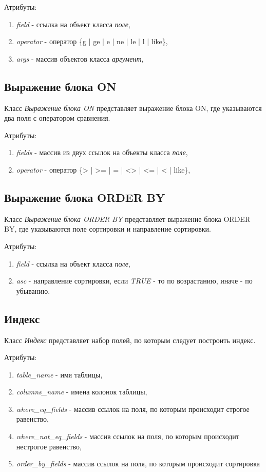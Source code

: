 Атрибуты:
\begin{enumerate}
\item \textit{field} - ссылка на объект класса \textit{поле},
\item \textit{operator} - оператор \{g | ge | e | ne | le | l | like\},
\item \textit{args} - массив объектов класса \textit{аргумент},
\end{enumerate}


\subsection{Выражение блока ON}
Класс \textit{Выражение блока ON} представляет выражение блока ON, где указываются два поля с оператором сравнения.

Атрибуты:
\begin{enumerate}
\item \textit{fields} - массив из двух ссылок на объекты класса \textit{поле},
\item \textit{operator} - оператор \{> | >= | = | <> | <= | < | like\},
\end{enumerate}

\subsection{Выражение блока ORDER BY}
Класс \textit{Выражение блока ORDER BY} представляет выражение блока ORDER BY, где указываются поле сортировки и направление сортировки.

Атрибуты:
\begin{enumerate}
\item \textit{field} - ссылка на объект класса \textit{поле},
\item \textit{asc} - направление сортировки, если \textit{TRUE} - то по возрастанию, иначе - по убыванию.
\end{enumerate}


\subsection{Индекс}
Класс \textit{Индекс} представляет набор полей, по которым следует построить индекс.

Атрибуты:
\begin{enumerate}
\item \textit{table_name} - имя таблицы,
\item \textit{columns_name} - имена колонок таблицы,
\item \textit{where_eq_fields} - массив ссылок на поля, по которым происходит строгое равенство,
\item \textit{where_not_eq_fields} - массив ссылок на поля, по которым происходит нестрогое равенство,
\item \textit{order_by_fields} - массив ссылок на поля, по которым происходит сортировка 
\end{enumerate}

